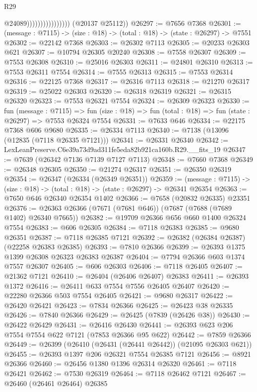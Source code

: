 \begin{lexlean}{R29}
\begin{coremodule}
                                      @24089))))))))))))))))
      (@20137 @25112))
@26297 := @7656 @7368
@26301 := (message : @7115) -> (size : @18) -> (total : @18) -> (state : @26297) -> @7551
@26302 := @22142 @7368
@26303 := @26302 @7113
@26305 := @20233 @26303 @621
@26307 := @10794 @26305 @20240
@26308 := @7558 @26307
@26309 := @7553 @26308
@26310 := @25016 @26303
@26311 := @24801 @26310
@26313 := @7553 @26311 @7554
@26314 := @7555 @26313
@26315 := @7553 @26314
@26316 := @22125 @7368
@26317 := @26316 @7113
@26318 := @21270 @26317
@26319 := @25022 @26303
@26320 := @26318 @26319
@26321 := @26315 @26320
@26323 := @7553 @26321 @7554
@26324 := @26309 @26323
@26330 := fun (message : @7115) =>
  fun (size : @18) => fun (total : @18) => fun (state : @26297) => @7553 @26324 @7554
@26331 := @7633 @646
@26334 := @22175 @7368 @606 @9680
@26335 := @26334 @7113
@26340 := @7138 (@13096 (@12835 (@7118 @26335 @7121)))
@26341 := @26331 @26340
@26342 := LexLeanPreserve.C6e39a73d9ad311fe5eda82b921ca160b.R29.__fits_19
@26347 := @7639 (@26342 @7136 @7139 @7127 @7113)
@26348 := @7660 @7368
@26349 := @26348 @26305
@26350 := @21274 @26317
@26351 := @26350 @26319
@26354 := @26347 (@26334 (@26349 @26351))
@26359 := (message : @7115) -> (size : @18) -> (total : @18) -> (state : @26297) -> @26341 @26354
@26363 := @7650 @646 @26340 @26354 @1402
@26366 := @7658 (@20832 @26335) @23351
@26376 := @26363 @26366 (@7671 (@7681 @646)) (@7687 (@7688 (@7689 @1402) @26340 @7665))
@26382 := @19709 @26366 @656 @660 @1400 @26324 @7554
@26383 := @606 @26305
@26384 := @7118 @26383
@26385 := @9680 @26351
@26387 := @7118 @26385 @7121
@26392 := @26382 (@26384 @26387) (@22258 @26383 @26385)
@26393 := @7810 @26366
@26399 := @26393 @1375 @1399 @26308 @26323 @26383 @26387
@26404 := @7794 @26366 @603 @1374 @7557 @26307
@26405 := @606 @26303
@26406 := @7118 @26405
@26407 := @21362 @7121
@26410 := @26404 (@26406 @26407) @26383
@26411 := @26393 @1372
@26416 := @26411 @633 @7554 @7556 @26405 @26407
@26420 := @22280 @26366 @503 @7554 @26405
@26421 := @9680 @26317
@26422 := @26420 @26421
@26423 := @7834 @26366
@26425 := @26423 @38 @26335
@26426 := @7840 @26366
@26429 := @26425 (@7839 (@26426 @38))
@26430 := @26422 @26429
@26431 := @26416 @26430
@26441 := @26393 @623 @206 @7554 @7554 @622 @7121 (@7853 @26366 @95 @622)
@26442 := @7859 @26366
@26449 := @26399 (@26410 (@26431 (@26441 @26442)) (@21095 @26303 @621))
@26455 := @26393 @1397 @206 @26321 @7554 @26385 @7121
@26456 := @8921 @26366
@26460 := @26456 @1380 @1396 @26314 @26320
@26461 := @7118 @26421
@26462 := @7530 @26319
@26464 := @7118 @26462 @7121
@26467 := @26460 (@26461 @26464) @26385

\end{coremodule}
\end{lexlean}
